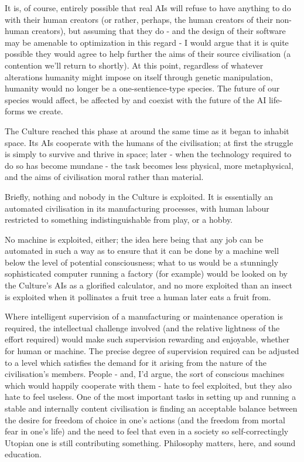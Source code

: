 It is, of course, entirely possible that real AIs will refuse to have anything to do with their human creators (or rather, perhaps, the human creators of their non-human creators), but assuming that they do - and the design of their software may be amenable to optimization in this regard - I would argue that it is quite possible they would agree to help further the aims of their source civilisation (a contention we'll return to shortly). At this point, regardless of whatever alterations humanity might impose on itself through genetic manipulation, humanity would no longer be a one-sentience-type species. The future of our species would affect, be affected by and coexist with the future of the AI life-forms we create.

The Culture reached this phase at around the same time as it began to inhabit space. Its AIs cooperate with the humans of the civilisation; at first the struggle is simply to survive and thrive in space; later - when the technology required to do so has become mundane - the task becomes less physical, more metaphysical, and the aims of civilisation moral rather than material.

Briefly, nothing and nobody in the Culture is exploited. It is essentially an automated civilisation in its manufacturing processes, with human labour restricted to something indistinguishable from play, or a hobby.

No machine is exploited, either; the idea here being that any job can be automated in such a way as to ensure that it can be done by a machine well below the level of potential consciousness; what to us would be a stunningly sophisticated computer running a factory (for example) would be looked on by the Culture's AIs as a glorified calculator, and no more exploited than an insect is exploited when it pollinates a fruit tree a human later eats a fruit from.

Where intelligent supervision of a manufacturing or maintenance operation is required, the intellectual challenge involved (and the relative lightness of the effort required) would make such supervision rewarding and enjoyable, whether for human or machine. The precise degree of supervision required can be adjusted to a level which satisfies the demand for it arising from the nature of the civilisation's members. People - and, I'd argue, the sort of conscious machines which would happily cooperate with them - hate to feel exploited, but they also hate to feel useless. One of the most important tasks in setting up and running a stable and internally content civilisation is finding an acceptable balance between the desire for freedom of choice in one's actions (and the freedom from mortal fear in one's life) and the need to feel that even in a society so self-correctingly Utopian one is still contributing something. Philosophy matters, here, and sound education.

